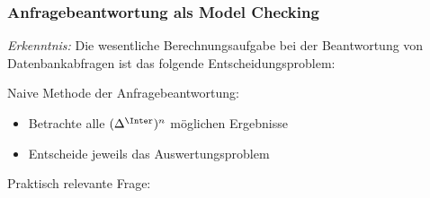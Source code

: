 \documentclass[aspectratio=1610,onlymath]{beamer}
\begin{document}
\begin{frame}\frametitle{Anfragebeantwortung als Model Checking}

\emph{Erkenntnis:} Die wesentliche Berechnungsaufgabe bei der Beantwortung von Datenbankabfragen ist das folgende Entscheidungsproblem:\bigskip

\bigskip\pause

Naive Methode der Anfragebeantwortung:
\begin{itemize}
\item Betrachte alle $(\Delta^\Inter)^n$ möglichen Ergebnisse
\item Entscheide jeweils das Auswertungsproblem
\end{itemize}

Praktisch relevante Frage:\medskip


\end{frame}
\end{document}
